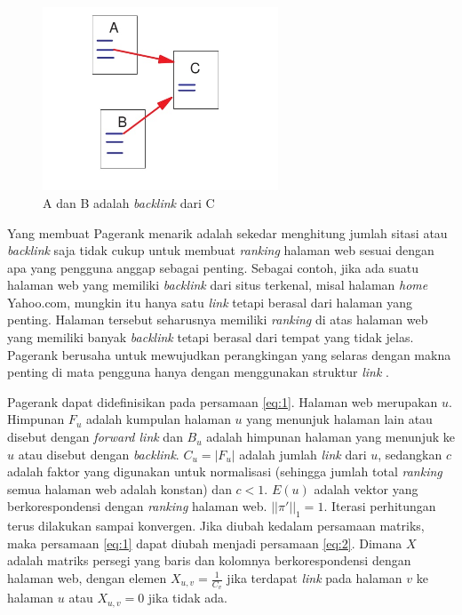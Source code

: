 \begin{figure}[H]
	\centering
	\includegraphics[keepaspectratio, width=7cm]{gambar/web_graph_ilustration}
	\caption{A dan B adalah \textit{backlink} dari C \citep{ilprints422}}
	\label{gambar:web_graph_ilustration}
\end{figure}

Yang membuat Pagerank menarik adalah sekedar menghitung jumlah sitasi atau \textit{backlink} saja tidak cukup untuk membuat \textit{ranking} halaman web sesuai dengan apa yang pengguna anggap sebagai penting. Sebagai contoh, jika ada suatu halaman web yang memiliki \textit{backlink} dari situs terkenal, misal halaman \textit{home} Yahoo.com, mungkin itu hanya satu \textit{link} tetapi berasal dari halaman yang penting. Halaman tersebut seharusnya memiliki \textit{ranking} di atas halaman web yang memiliki banyak \textit{backlink} tetapi berasal dari tempat yang tidak jelas. Pagerank berusaha untuk mewujudkan perangkingan yang selaras dengan makna penting di mata pengguna hanya dengan menggunakan struktur \textit{link} \citep{ilprints422}.

Pagerank dapat didefinisikan pada persamaan \ref{eq:1}. Halaman web merupakan $u$. Himpunan $F_u$ adalah kumpulan halaman $u$ yang menunjuk halaman lain atau disebut dengan \textit{forward link} dan $B_u$ adalah himpunan halaman yang menunjuk ke $u$ atau disebut dengan \textit{backlink}. $C_u = |F_u|$ adalah jumlah \textit{link} dari $u$, sedangkan $c$ adalah faktor yang digunakan untuk normalisasi (sehingga jumlah total \textit{ranking} semua halaman web adalah konstan) dan $c < 1$. $E(u)$ adalah vektor yang berkorespondensi dengan \textit{ranking} halaman web. $||\pi'||_1 = 1$. Iterasi perhitungan terus dilakukan sampai konvergen. Jika diubah kedalam persamaan matriks, maka persamaan \ref{eq:1} dapat diubah menjadi persamaan \ref{eq:2}. Dimana $X$ adalah matriks persegi yang baris dan kolomnya berkorespondensi dengan halaman web, dengan elemen $X_{u,v} = \frac{1}{C_v}$ jika terdapat \textit{link} pada halaman $v$ ke halaman $u$ atau $X_{u,v} = 0$ jika tidak ada.

